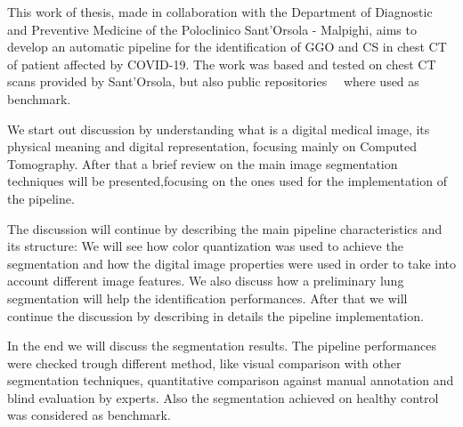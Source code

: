\documentclass{standalone}
\begin{document}
This work of thesis, made in collaboration with the Department of Diagnostic and Preventive Medicine of the Poloclinico Sant'Orsola - Malpighi, aims to develop an automatic pipeline for the identification of GGO and CS in chest CT of patient affected by COVID-19. The work was based and tested on chest CT scans provided by Sant'Orsola, but also public repositories~\cite{DATA:ZENODO}~\cite{DATA:MOSMED} where used as benchmark.

We start out discussion by understanding what is a digital medical image, its physical meaning and digital representation, focusing mainly on Computed Tomography. After that a brief review on the main image segmentation techniques will be presented,focusing on the ones used for the implementation of the pipeline.

The discussion will continue by describing the main pipeline characteristics and its structure: We will see how color quantization was used to achieve the segmentation and how the digital image properties were used in order to take into account different image features. We also discuss how a preliminary lung segmentation will help the identification performances. After that we will continue the discussion by describing in details the pipeline implementation.

In the end we will discuss the segmentation results. The pipeline performances were checked trough different method, like visual comparison with other segmentation techniques, quantitative comparison against manual annotation and blind evaluation by experts. Also the segmentation achieved on healthy control was considered as benchmark.
\end{document}
